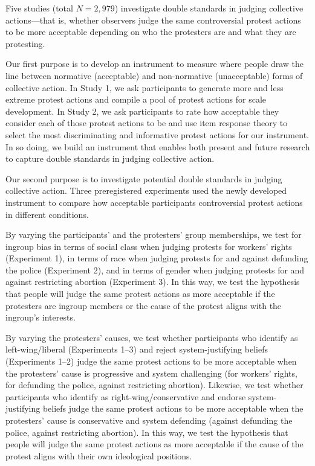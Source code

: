 \documentclass[12pt, letterpaper]{article}
\begin{document}
Five studies (total \(N = 2,979\)) investigate double standards in
judging collective actions---that is, whether observers judge the same
controversial protest actions to be more acceptable depending on who the
protesters are and what they are protesting.

Our first purpose is to develop an instrument to measure where people
draw the line between normative (acceptable) and non-normative
(unacceptable) forms of collective action. In Study 1, we ask
participants to generate more and less extreme protest actions and
compile a pool of protest actions for scale development. In Study 2, we
ask participants to rate how acceptable they consider each of those
protest actions to be and use item response theory to select the most
discriminating and informative protest actions for our instrument. In so
doing, we build an instrument that enables both present and future
research to capture double standards in judging collective action.

Our second purpose is to investigate potential double standards in
judging collective action. Three preregistered experiments used the
newly developed instrument to compare how acceptable participants
controversial protest actions in different conditions.

By varying the participants' and the protesters' group memberships, we
test for ingroup bias in terms of social class when judging protests for
workers' rights (Experiment 1), in terms of race when judging protests
for and against defunding the police (Experiment 2), and in terms of
gender when judging protests for and against restricting abortion
(Experiment 3). In this way, we test the hypothesis that people will
judge the same protest actions as more acceptable if the protesters are
ingroup members or the cause of the protest aligns with the ingroup's
interests.

By varying the protesters' causes, we test whether participants who
identify as left-wing/liberal (Experiments 1--3) and reject
system-justifying beliefs (Experiments 1--2) judge the same protest
actions to be more acceptable when the protesters' cause is progressive
and system challenging (for workers' rights, for defunding the police,
against restricting abortion). Likewise, we test whether participants
who identify as right-wing/conservative and endorse system-justifying
beliefs judge the same protest actions to be more acceptable when the
protesters' cause is conservative and system defending (against
defunding the police, against restricting abortion). In this way, we
test the hypothesis that people will judge the same protest actions as
more acceptable if the cause of the protest aligns with their own
ideological positions.
\end{document}
